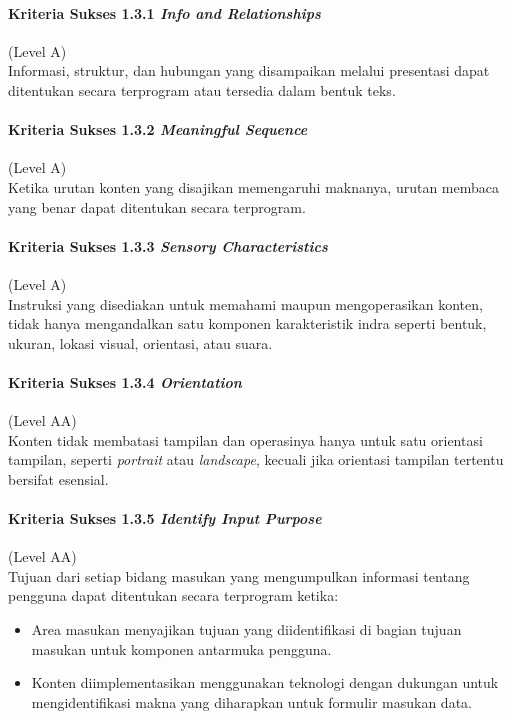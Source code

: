 \paragraph{Kriteria Sukses 1.3.1 \textit{Info and Relationships}}
\label{sec:kriteria_sukses_1.3.1}
(Level A)\\

Informasi, struktur, dan hubungan yang disampaikan melalui presentasi dapat ditentukan secara terprogram atau tersedia dalam bentuk teks. 

\paragraph{Kriteria Sukses 1.3.2 \textit{Meaningful Sequence}}
\label{sec:kriteria_sukses_1.3.2}
(Level A)\\

Ketika urutan konten yang disajikan memengaruhi maknanya, urutan membaca yang benar dapat ditentukan secara terprogram.

\paragraph{Kriteria Sukses 1.3.3 \textit{Sensory Characteristics}}
\label{sec:kriteria_sukses_1.3.3}
(Level A)\\

Instruksi yang disediakan untuk memahami maupun mengoperasikan konten, tidak hanya mengandalkan satu komponen karakteristik indra seperti bentuk, ukuran, lokasi visual, orientasi, atau suara.

\paragraph{Kriteria Sukses 1.3.4 \textit{Orientation}}
\label{sec:kriteria_sukses_1.3.4}
(Level AA)\\

Konten tidak membatasi tampilan dan operasinya hanya untuk satu orientasi tampilan, seperti \textit{portrait} atau \textit{landscape}, kecuali jika orientasi tampilan tertentu bersifat esensial.

\paragraph{Kriteria Sukses 1.3.5 \textit{Identify Input Purpose}}
\label{sec:kriteria_sukses_1.3.5}
(Level AA)\\

Tujuan dari setiap bidang masukan yang mengumpulkan informasi tentang pengguna dapat ditentukan secara terprogram ketika:
\begin{itemize}
	\item Area masukan menyajikan tujuan yang diidentifikasi di bagian tujuan masukan untuk komponen antarmuka pengguna.
	\item Konten diimplementasikan menggunakan teknologi dengan dukungan untuk mengidentifikasi makna yang diharapkan untuk formulir masukan data.
\end{itemize}

